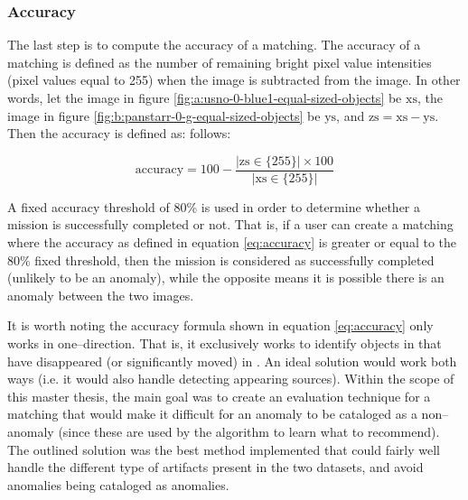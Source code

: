 \subsubsection{Accuracy} \label{subsubsect:case-study:impl:accuracy}
The last step is to compute the accuracy of a matching. The accuracy of a matching is defined as the number of remaining bright pixel value intensities (pixel values equal to 255) when the \usno image is subtracted from the \panstarrs image. In other words, let the \usno image in figure \ref{fig:a:usno-0-blue1-equal-sized-objects} be $\text{xs}$, the \panstarrs image in figure \ref{fig:b:panstarr-0-g-equal-sized-objects} be $\text{ys}$, and $\text{zs}=\text{xs} - \text{ys}$. Then the accuracy is defined as: follows:

\begin{equation} \label{eq:accuracy}
    \text{accuracy} = 100 - \frac{|\text{zs} \in \{255\} | \times 100}{|\text{xs} \in \{255\} |}
\end{equation}

A fixed accuracy threshold of $80$\% is used in order to determine whether a mission is successfully completed or not. That is, if a user can create a matching where the accuracy as defined in equation \ref{eq:accuracy} is greater or equal to the $80$\% fixed threshold, then the mission is considered as successfully completed (unlikely to be an anomaly), while the opposite means it is possible there is an anomaly between the two images. \newline

It is worth noting the accuracy formula shown in equation \ref{eq:accuracy} only works in one--direction. That is, it exclusively works to identify objects in \usno that have disappeared (or significantly moved) in \panstarrs. An ideal solution would work both ways (i.e. it would also handle detecting appearing sources). Within the scope of this master thesis, the main goal was to create an evaluation technique for a matching that would make it difficult for an anomaly to be cataloged as a non--anomaly (since these are used by the \mlblink algorithm to learn what to recommend). The outlined solution was the best method implemented that could fairly well handle the different type of artifacts present in the two datasets, and avoid anomalies being cataloged as anomalies.
